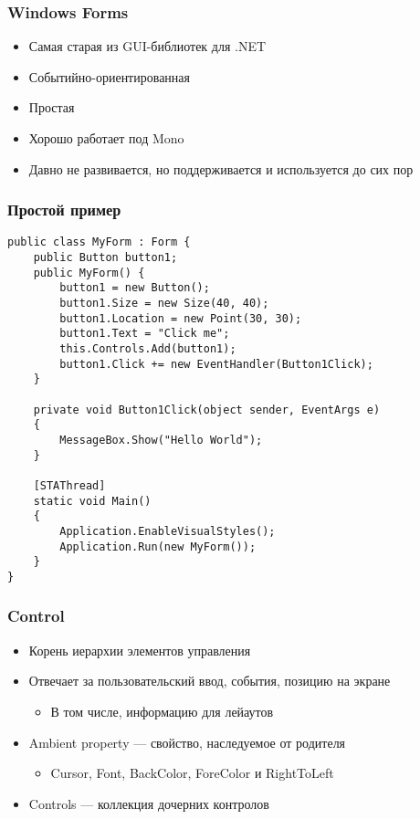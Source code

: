 \documentclass{../../slides-style}
\begin{document}
    \begin{frame}[plain]
        \titlepage
    \end{frame}

    \begin{frame}
        \frametitle{Windows Forms}
        \begin{itemize}
            \item Самая старая из GUI-библиотек для .NET
            \item Событийно-ориентированная
            \item Простая
            \item Хорошо работает под Mono
            \item Давно не развивается, но поддерживается и используется до сих пор
        \end{itemize}
    \end{frame}

    \begin{frame}[fragile]
        \frametitle{Простой пример}
        \begin{scriptsize}
            \begin{verbatim}
public class MyForm : Form {
    public Button button1;
    public MyForm() {
        button1 = new Button();
        button1.Size = new Size(40, 40);
        button1.Location = new Point(30, 30);
        button1.Text = "Click me";
        this.Controls.Add(button1);
        button1.Click += new EventHandler(Button1Click);
    }

    private void Button1Click(object sender, EventArgs e)
    {
        MessageBox.Show("Hello World");
    }

    [STAThread]
    static void Main()
    {
        Application.EnableVisualStyles();
        Application.Run(new MyForm());
    }
}
            \end{verbatim}
        \end{scriptsize}
    \end{frame}

    \begin{frame}
        \frametitle{Control}
        \begin{itemize}
            \item Корень иерархии элементов управления
            \item Отвечает за пользовательский ввод, события, позицию на экране
            \begin{itemize}
                \item В том числе, информацию для лейаутов
            \end{itemize}
            \item Ambient property --- свойство, наследуемое от родителя
            \begin{itemize}
                \item Cursor, Font, BackColor, ForeColor и RightToLeft
            \end{itemize}
            \item Controls --- коллекция дочерних контролов
        \end{itemize}
    \end{frame}
\end{document}

